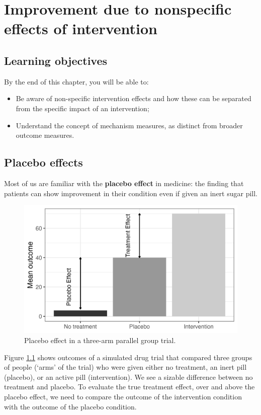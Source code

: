 \documentclass{krantz}
\begin{document}
\hypertarget{nonspecific}{%
\chapter{Improvement due to nonspecific effects of intervention}\label{nonspecific}}

\hypertarget{learning-objectives-3}{%
\section{Learning objectives}\label{learning-objectives-3}}

By the end of this chapter, you will be able to:

\begin{itemize}
\item
  Be aware of non-specific intervention effects and how these can be separated from the specific impact of an intervention;
\item
  Understand the concept of mechanism measures, as distinct from broader outcome measures.
\end{itemize}

\hypertarget{placebo-effects}{%
\section{Placebo effects}\label{placebo-effects}}

Most of us are familiar with the \textbf{placebo effect} in medicine: the finding that patients can show improvement in their condition even if given an inert sugar pill.

\begin{figure}
\includegraphics[width=0.75\linewidth]{images_bw/placebotab} \caption{Placebo effect in a three-arm parallel group trial.}\label{fig:placebotab}
\end{figure}

Figure \ref{fig:placebotab} shows outcomes of a simulated drug trial that compared three groups of people (`arms' of the trial) who were given either no treatment, an inert pill (placebo), or an active pill (intervention). We see a sizable difference between no treatment and placebo. To evaluate the true treatment effect, over and above the placebo effect, we need to compare the outcome of the intervention condition with the outcome of the placebo condition.
\end{document}
